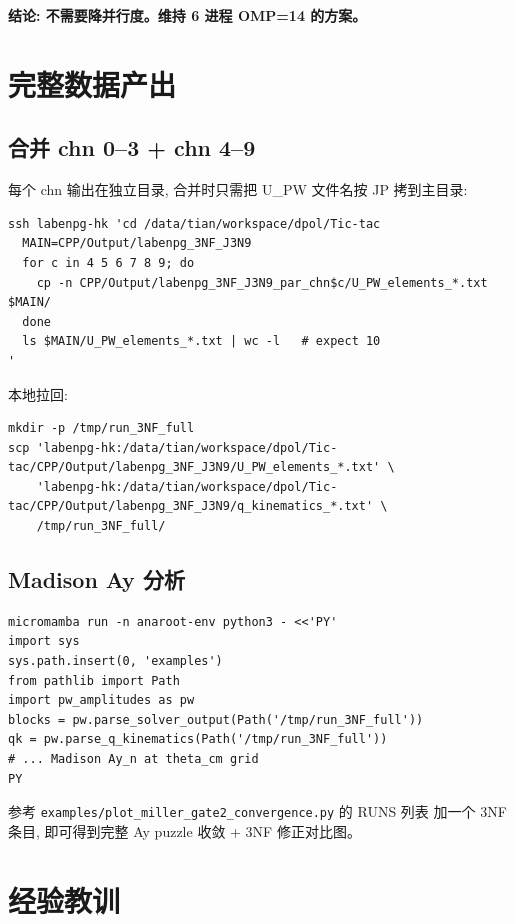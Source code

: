 \documentclass[11pt,a4paper]{article}
\begin{document}
\textbf{结论: 不需要降并行度。维持 6 进程 OMP=14 的方案。}

\section{完整数据产出}

\subsection{合并 chn 0--3 + chn 4--9}

每个 chn 输出在独立目录, 合并时只需把 U\_PW 文件名按 JP 拷到主目录:

\begin{lstlisting}
ssh labenpg-hk 'cd /data/tian/workspace/dpol/Tic-tac
  MAIN=CPP/Output/labenpg_3NF_J3N9
  for c in 4 5 6 7 8 9; do
    cp -n CPP/Output/labenpg_3NF_J3N9_par_chn$c/U_PW_elements_*.txt $MAIN/
  done
  ls $MAIN/U_PW_elements_*.txt | wc -l   # expect 10
'
\end{lstlisting}

本地拉回:
\begin{lstlisting}
mkdir -p /tmp/run_3NF_full
scp 'labenpg-hk:/data/tian/workspace/dpol/Tic-tac/CPP/Output/labenpg_3NF_J3N9/U_PW_elements_*.txt' \
    'labenpg-hk:/data/tian/workspace/dpol/Tic-tac/CPP/Output/labenpg_3NF_J3N9/q_kinematics_*.txt' \
    /tmp/run_3NF_full/
\end{lstlisting}

\subsection{Madison Ay 分析}

\begin{lstlisting}
micromamba run -n anaroot-env python3 - <<'PY'
import sys
sys.path.insert(0, 'examples')
from pathlib import Path
import pw_amplitudes as pw
blocks = pw.parse_solver_output(Path('/tmp/run_3NF_full'))
qk = pw.parse_q_kinematics(Path('/tmp/run_3NF_full'))
# ... Madison Ay_n at theta_cm grid
PY
\end{lstlisting}

参考 \texttt{examples/plot\_miller\_gate2\_convergence.py} 的 RUNS 列表
加一个 3NF 条目, 即可得到完整 Ay puzzle 收敛 + 3NF 修正对比图。

\section{经验教训}
\end{document}
